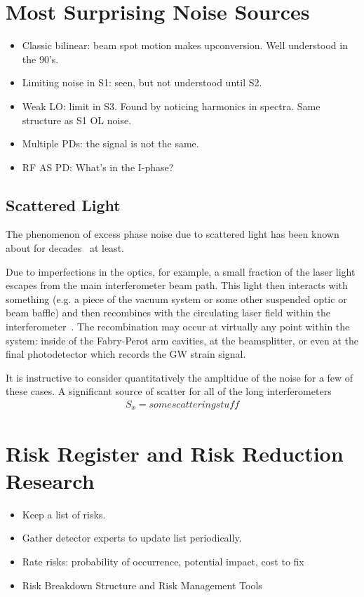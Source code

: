 \section{Most Surprising Noise Sources}

\begin{itemize}
  \item Classic bilinear: beam spot motion makes upconversion. Well understood in the 90's.
  \item Limiting noise in S1: seen, but not understood until S2.
  \item Weak LO: limit in S3. Found by noticing harmonics in spectra. Same structure as S1 OL noise.
  \item Multiple PDs: the signal is not the same.
  \item RF AS PD: What's in the I-phase?
\end{itemize}


\subsection{Scattered Light}
The phenomenon of excess phase noise due to scattered light has been known about for 
decades~\cite{Schilling:1981} at least.

Due to imperfections in the optics, for example, a small fraction of the laser light escapes from 
the main interferometer beam path. This light then interacts with something (e.g. a piece of the 
vacuum system or some other suspended optic or beam baffle) and then recombines with the 
circulating laser field within the 
interferometer~\cite{Kip:Scatter95, Kip:scatter1989, Sam:Scatter2012, Stefano:Scatter, Vinet:scatter, fritschel1998high}. 
The recombination may occur at virtually any point within the system: inside of the 
Fabry-Perot arm cavities, at the beamsplitter, or even at the final photodetector which 
records the GW strain signal.

It is instructive to consider quantitatively the ampltidue of the noise for a few of 
these cases. A significant source of scatter for all of the long interferometers
\begin{align}
S_x = some scattering stuff
\end{align}


\section{Risk Register and Risk Reduction Research}

\begin{itemize}
  \item Keep a list of risks.
  \item Gather detector experts to update list periodically.
  \item Rate risks: probability of occurrence, potential impact, cost to fix
  \item Risk Breakdown Structure and Risk Management Tools
\end{itemize}

